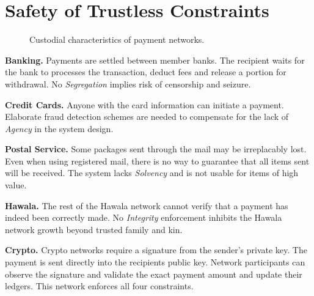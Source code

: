 \documentclass[12pt,a4paper]{article}
\begin{document}
\appendix
\newpage
\section{Safety of Trustless Constraints}\label{app:safety}
\begin{figure}[h]
\centering

\caption{Custodial characteristics of payment networks.}
\label{fig:custody}
\end{figure}

\textbf{Banking.} Payments are settled between member banks. The recipient waits for the bank to processes the transaction, deduct fees and release a portion for withdrawal. No \emph{Segregation} implies risk of censorship and seizure.

\textbf{Credit Cards.} Anyone with the card information can initiate a payment. Elaborate fraud detection schemes are needed to compensate for the lack of \emph{Agency} in the system design.

\textbf{Postal Service.} Some packages sent through the mail may be irreplacably lost. Even when using registered mail, there is no way to guarantee that all items sent will be received. The system lacks \emph{Solvency} and is not usable for items of high value.

\textbf{Hawala.} The rest of the Hawala network cannot verify that a payment has indeed been correctly made. No \emph{Integrity} enforcement inhibits the Hawala network growth beyond trusted family and kin. 

\textbf{Crypto.} Crypto networks require a signature from the sender's private key. The payment is sent directly into the recipients public key. Network participants can observe the signature and validate the exact payment amount and update their ledgers. This network enforces all four constraints.
\end{document}
